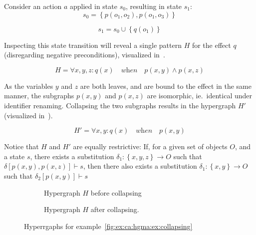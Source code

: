 \documentclass[../Master.tex]{subfiles}
\providecommand{\master}{..}
\begin{document}
\begin{example}\label{fig:ex:ca:hgma:ex:collapsing}

	Consider an action $a$ applied in state $s_0$, resulting in state $s_1$:
	\begin{equation*}
		s_0 = \left\{ 
			p\left(o_1, o_2\right), p\left(o_1, o_3\right)
		\right\}
	\end{equation*}

	\begin{equation*}
		s_1 = s_0 \cup \left\{
			q\left( o_1 \right)
		\right\}
	\end{equation*}

	Inspecting this state transition will reveal a single pattern $H$ for the effect $q$ (disregarding negative preconditions), visualized in~.

    \begin{equation*}
        H = \forall x, y, z : q(x) \quad \textit{when} \quad
            p(x,y) \land p(x,z)
    \end{equation*}

	As the variables $y$ and $z$ are both leaves, and are bound to the effect in the same manner, the subgraphs $p(x,y)$ and $p(x,z)$ are isomorphic, ie.\ identical under identifier renaming. Collapsing the two subgraphs results in the hypergraph $H'$ (visualized in~).
	
    \begin{equation*}
        H' = \forall x, y : q(x) \quad \textit{when} \quad p(x,y)
    \end{equation*}

	Notice that $H$ and $H'$ are equally restrictive: If, for a given set of objects $O$, and a state $s$, there exists a substitution $\delta_1 : \left\{x, y, z\right\} \rightarrow O$ such that $\delta\left[p(x,y), p(x,z)\right] \vdash s$, then there also exists a substitution $\delta_1 : \left\{x, y\right\} \rightarrow O$ such that $\delta_2\left[p(x,y)\right] \vdash s$

	\begin{figure}\label{fig:ex:ca:hgma:ex:collapsing}
        \centering
        \hfill
        \begin{subfigure}[b]{0.4\textwidth}
            \centering
            \resizebox{0.7\linewidth}{!}{}
            \caption{Hypergraph $H$ before collapsing}
            \label{fig:ex:ca:hgma:ex:isomorphic}
        \end{subfigure}%
        \hfill%
        \begin{subfigure}[b]{0.4\textwidth}
            \centering
            \resizebox{0.75\linewidth}{!}{}
            \caption{Hypergraph $H$ after collapsing.}
            \label{fig:ex:ca:hgma:ex:isomorphicReduced}
        \end{subfigure}
		\caption{Hyperrgaphs for example~\ref{fig:ex:ca:hgma:ex:collapsing}}
        \hfill
    \end{figure}
\end{example}
\end{document}

